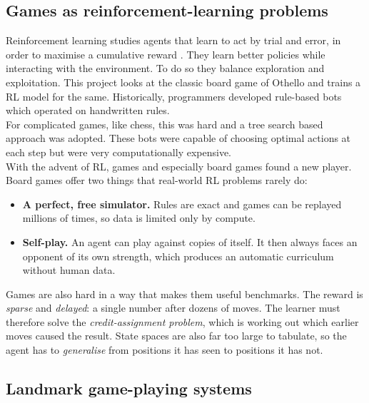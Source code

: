 \documentclass[11pt]{article}
\begin{document}
\subsection{Games as reinforcement-learning problems}
\hspace{2em} Reinforcement learning studies agents that learn to act by trial and error, in
order to maximise a cumulative reward \cite{sutton2018}. They learn better policies while interacting with the environment. To do so they balance exploration and exploitation. This project looks at the classic board game of Othello and trains a RL model for the same. Historically, programmers developed rule-based bots which operated on handwritten rules.\\
For complicated games, like chess, this was hard and a tree search based approach was adopted. These bots were capable of choosing optimal actions at each step but were very computationally expensive. \\
With the advent of RL, games and especially board games found a new player. Board games offer two
things that real-world RL problems rarely do:
\begin{itemize}[leftmargin=*]
  \item \textbf{A perfect, free simulator.} Rules are exact and games can be
        replayed millions of times, so data is limited only by compute.
  \item \textbf{Self-play.} An agent can play against copies of itself. It then
        always faces an opponent of its own strength, which produces an
        automatic curriculum without human data.
\end{itemize}
Games are also hard in a way that makes them useful benchmarks. The reward is
\emph{sparse} and \emph{delayed}: a single number after dozens of moves. The
learner must therefore solve the \emph{credit-assignment problem}, which is
working out which earlier moves caused the result. State spaces are also far too
large to tabulate, so the agent has to \emph{generalise} from positions it has
seen to positions it has not.

\subsection{Landmark game-playing systems}
\end{document}
